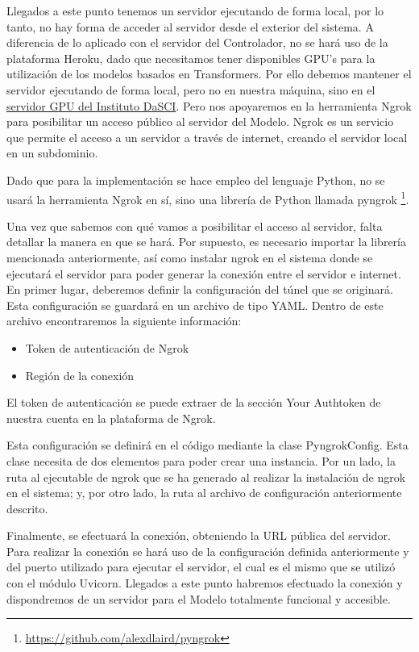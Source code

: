 Llegados a este punto tenemos un servidor ejecutando de forma local, por lo tanto, no hay forma de acceder al servidor desde el exterior del sistema. A diferencia de lo aplicado con el servidor del Controlador, no se hará uso de la plataforma Heroku, dado que necesitamos tener disponibles GPU's para la utilización de los modelos basados en Transformers. Por ello debemos mantener el servidor ejecutando de forma local, pero no en nuestra máquina, sino en el \href{https://dasci.es/es/sobre-dasci/recursos/recursos-tecnologicos/}{servidor GPU del Instituto DaSCI}. Pero nos apoyaremos en la herramienta Ngrok para posibilitar un acceso público al servidor del Modelo. Ngrok es un servicio que permite el acceso a un servidor a través de internet, creando el servidor local en un subdominio.

Dado que para la implementación se hace empleo del lenguaje Python, no se usará la herramienta Ngrok en sí, sino una librería de Python llamada pyngrok \footnote{\url{https://github.com/alexdlaird/pyngrok}}.

Una vez que sabemos con qué vamos a posibilitar el acceso al servidor, falta detallar la manera en que se hará. Por supuesto, es necesario importar la librería mencionada anteriormente, así como instalar ngrok en el sistema donde se ejecutará el servidor para poder generar la conexión entre el servidor e internet. En primer lugar, deberemos definir la configuración del túnel que se originará. Esta configuración se guardará en un archivo de tipo YAML. Dentro de este archivo encontraremos la siguiente información:

\begin{itemize}
\item Token de autenticación de Ngrok
\item Región de la conexión
\end{itemize}

El token de autenticación se puede extraer de la sección Your Authtoken de nuestra cuenta en la plataforma de Ngrok.

Esta configuración se definirá en el código mediante la clase PyngrokConfig. Esta clase necesita de dos elementos para poder crear una instancia. Por un lado, la ruta al ejecutable de ngrok que se ha generado al realizar la instalación de ngrok en el sistema; y, por otro lado, la ruta al archivo de configuración anteriormente descrito.

Finalmente, se efectuará la conexión, obteniendo la URL pública del servidor. Para realizar la conexión se hará uso de la configuración definida anteriormente y del puerto utilizado para ejecutar el servidor, el cual es el mismo que se utilizó con el módulo Uvicorn. Llegados a este punto habremos efectuado la conexión y dispondremos de un servidor para el Modelo totalmente funcional y accesible.

